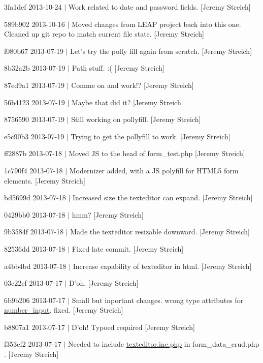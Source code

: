 \begin{DoxyItemize}
\item 3fa1def 2013-\/10-\/24 $|$ Work related to date and password fields. \mbox{[}Jeremy Streich\mbox{]}
\item 589b902 2013-\/10-\/16 $|$ Moved changes from L\-E\-A\-P project back into this one. Cleaned up git repo to match current file state. \mbox{[}Jeremy Streich\mbox{]}
\item f080b67 2013-\/07-\/19 $|$ Let's try the polly fill again from scratch. \mbox{[}Jeremy Streich\mbox{]}
\item 8b32a2b 2013-\/07-\/19 $|$ Path stuff. \-:( \mbox{[}Jeremy Streich\mbox{]}
\item 87ed9a1 2013-\/07-\/19 $|$ Comme on and work!? \mbox{[}Jeremy Streich\mbox{]}
\item 56b4123 2013-\/07-\/19 $|$ Maybe that did it? \mbox{[}Jeremy Streich\mbox{]}
\item 8756590 2013-\/07-\/19 $|$ Still working on pollyfill. \mbox{[}Jeremy Streich\mbox{]}
\item e5c90b3 2013-\/07-\/19 $|$ Trying to get the pollyfill to work. \mbox{[}Jeremy Streich\mbox{]}
\item ff2887b 2013-\/07-\/18 $|$ Moved J\-S to the head of form\-\_\-test.\-php \mbox{[}Jeremy Streich\mbox{]}
\item 1c790f4 2013-\/07-\/18 $|$ Modernizer added, with a J\-S polyfill for H\-T\-M\-L5 form elements. \mbox{[}Jeremy Streich\mbox{]}
\item bd5699d 2013-\/07-\/18 $|$ Increased size the texteditor can expand. \mbox{[}Jeremy Streich\mbox{]}
\item 0429bb0 2013-\/07-\/18 $|$ hmm? \mbox{[}Jeremy Streich\mbox{]}
\item 9b3584f 2013-\/07-\/18 $|$ Made the texteditor resizable downward. \mbox{[}Jeremy Streich\mbox{]}
\item 82536dd 2013-\/07-\/18 $|$ Fixed late commit. \mbox{[}Jeremy Streich\mbox{]}
\item a4bb4bd 2013-\/07-\/18 $|$ Increase capability of texteditor in html. \mbox{[}Jeremy Streich\mbox{]}
\item 03c22cf 2013-\/07-\/17 $|$ D'oh. \mbox{[}Jeremy Streich\mbox{]}
\item 6b9b206 2013-\/07-\/17 $|$ Small but inportant changes. wrong type attributes for \hyperlink{classnumber__input}{number\-\_\-input}. fixed. \mbox{[}Jeremy Streich\mbox{]}
\item b8807a1 2013-\/07-\/17 $|$ D'oh! Typoed required \mbox{[}Jeremy Streich\mbox{]}
\item f353ef2 2013-\/07-\/17 $|$ Needed to include \hyperlink{texteditor_8inc_8php}{texteditor.\-inc.\-php} in form\-\_\-data\-\_\-crud.\-php . \mbox{[}Jeremy Streich\mbox{]}

\end{DoxyItemize}
